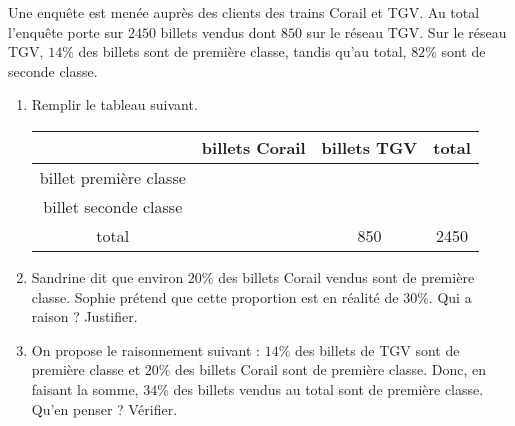 
\begin{exercice}\label{exosmath-0089}

Une enquête est menée auprès des clients des trains Corail et TGV. Au total l'enquête porte sur \( 2450\) billets vendus dont \( 850\) sur le réseau TGV. Sur le réseau TGV, \( 14\%\) des billets sont de première classe, tandis qu'au total, \( 82\%\) sont de seconde classe.

\begin{enumerate}
    \item
        Remplir le tableau suivant.

\begin{center}
        \begin{tabular}[]{|c||c|c|c|}
            \hline
            &billets Corail&billets TGV& total\\
            \hline\hline
            billet première classe&&&\\
            \hline
            billet seconde classe&&&\\
            \hline
            total&&850&2450\\
            \hline
        \end{tabular}
\end{center}
\item
    Sandrine dit que environ \( 20\%\) des billets Corail vendus sont de première classe. Sophie prétend que cette proportion est en réalité de \( 30\%\). Qui a raison ? Justifier.
\item
    On propose le raisonnement suivant : \( 14\%\) des billets de TGV sont de première classe et \( 20\%\) des billets Corail sont de première classe. Donc, en faisant la somme, \( 34\%\) des billets vendus au total sont de première classe. Qu'en penser ? Vérifier.
\end{enumerate}

\end{exercice}
